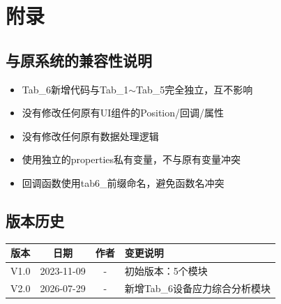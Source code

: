 \documentclass[12pt,a3paper]{ctexart}
\begin{document}
\section{附录}

\subsection{与原系统的兼容性说明}

\begin{itemize}
    \item Tab\_6新增代码与Tab\_1$\sim$Tab\_5完全独立，互不影响
    \item 没有修改任何原有UI组件的Position/回调/属性
    \item 没有修改任何原有数据处理逻辑
    \item 使用独立的properties私有变量，不与原有变量冲突
    \item 回调函数使用tab6\_前缀命名，避免函数名冲突
\end{itemize}

\subsection{版本历史}

\begin{table}[H]
\centering
\begin{tabular}{c|c|c|l}
\toprule
\textbf{版本} & \textbf{日期} & \textbf{作者} & \textbf{变更说明} \\
\midrule
V1.0 & 2023-11-09 & - & 初始版本：5个模块 \\
V2.0 & 2026-07-29 & - & 新增Tab\_6设备应力综合分析模块 \\
\bottomrule
\end{tabular}
\end{table}
\end{document}
